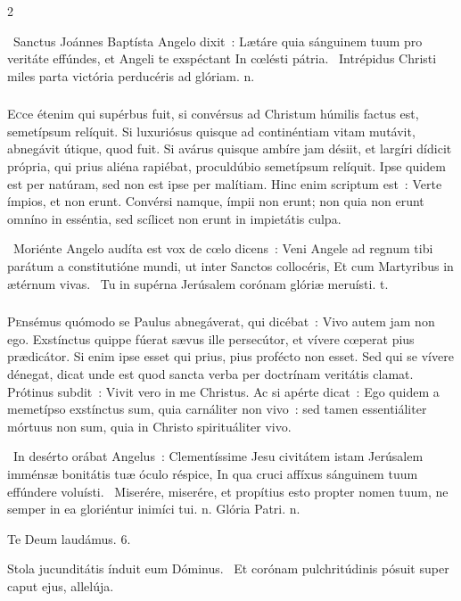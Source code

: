 \documentclass[9pt,twoside]{extarticle}
\begin{document}
\begin{multicols}{2}
{\begin{tightlist}{}
~Sanctus Joánnes Baptísta Angelo dixit~: Lætáre quia sánguinem tuum pro veritáte effúndes, et Angeli te exspéctant \textred{*} In cœlésti pátria.
~Intrépidus Christi miles parta victória perducéris ad glóriam. n.
\end{tightlist}

\subsubsection*{\center {}}
\lettrine{E}cce étenim qui supérbus fuit, si convérsus ad Christum húmilis factus est, semetípsum relíquit. Si luxuriósus quisque ad continéntiam vitam mutávit, abnegávit útique, quod fuit. Si avárus quisque ambíre jam désiit, et largíri dídicit própria, qui prius aliéna rapiébat, proculdúbio semetípsum relíquit. Ipse quidem est per natúram, sed non est ipse per malítiam. Hinc enim scriptum est~: Verte ímpios, et non erunt. Convérsi namque, ímpii non erunt; non quia non erunt omníno in esséntia, sed scílicet non erunt in impietátis culpa.

\begin{tightlist}{}
\item {}~Moriénte Angelo audíta est vox de cœlo dicens~: Veni Angele ad regnum tibi parátum a constitutióne mundi, ut inter Sanctos collocéris, \textred{*} Et cum Martyribus in ætérnum vivas.
~Tu in supérna Jerúsalem corónam glóriæ meruísti. t.
\end{tightlist}

\subsubsection*{\center {}}
\lettrine{P}ensémus quómodo se Paulus abnegáverat, qui dicébat~: Vivo autem jam non ego. Exstínctus quippe fúerat sævus ille persecútor, et vívere cœperat pius prædicátor. Si enim ipse esset qui prius, pius profécto non esset. Sed qui se vívere dénegat, dicat unde est quod sancta verba per doctrínam veritátis clamat. Prótinus subdit~: Vivit vero in me Christus. Ac si apérte dicat~: Ego quidem a memetípso exstínctus sum, quia carnáliter non vivo~: sed tamen essentiáliter mórtuus non sum, quia in Christo spirituáliter vivo.

\begin{tightlist}{}
\item {}~In desérto orábat Angelus~: Clementíssime Jesu civitátem istam Jerúsalem imménsæ bonitátis tuæ óculo réspice, \textred{*} In qua cruci affíxus sánguinem tuum effúndere voluísti.
~Miserére, miserére, et propítius esto propter nomen tuum, ne semper in ea gloriéntur inimíci tui. n. Glória Patri. n.
\item Te Deum laudámus. 6.
\item {} Stola jucunditátis índuit eum Dóminus. ~Et corónam pulchritúdinis pósuit super caput ejus, allelúja.
\end{tightlist}

}
\end{multicols}
\end{document}
